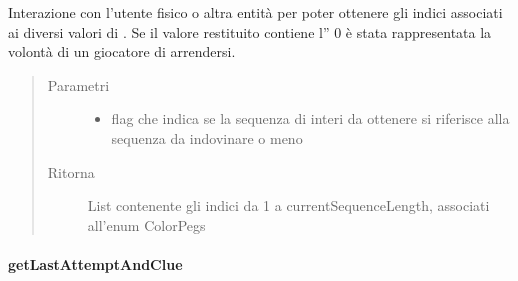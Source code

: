 \documentclass[letterpaper,10pt,italian,openany,oneside]{sphinxmanual}
\begin{document}
\begin{fulllineitems}
\label{\detokenize{source/it/unicam/cs/pa/mastermind/ui/InteractionView:it.unicam.cs.pa.mastermind.ui.InteractionView.getIndexSequence(boolean)}}
Interazione con l’utente fisico o altra entità per poter ottenere gli indici associati ai diversi valori di . Se il valore restituito contiene l” 0 è stata rappresentata la volontà di un giocatore  di arrendersi.
\begin{quote}\begin{description}
\item[{Parametri}] \leavevmode\begin{itemize}
\item {} 
 \textendash{} flag che indica se la sequenza di interi da ottenere si riferisce alla sequenza da indovinare o meno

\end{itemize}

\item[{Ritorna}] \leavevmode
List contenente gli indici da 1 a currentSequenceLength, associati all’enum ColorPegs

\end{description}\end{quote}

\end{fulllineitems}



\paragraph{getLastAttemptAndClue}
\label{\detokenize{source/it/unicam/cs/pa/mastermind/ui/InteractionView:getlastattemptandclue}}
\end{document}
